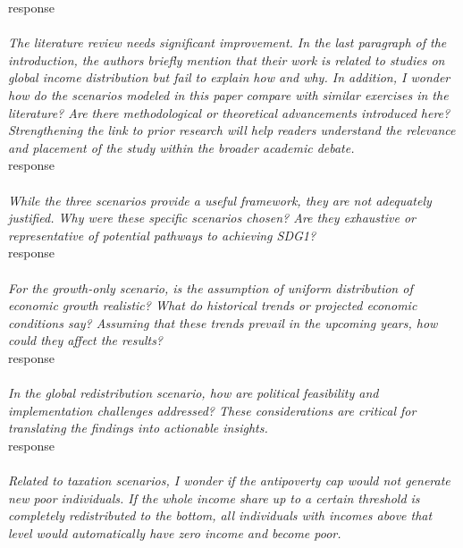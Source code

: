 \documentclass[12pt,english]{article}
\begin{document}
response
~\\ ~\\

\textit{The literature review needs significant improvement. In the last paragraph of the introduction, the authors briefly mention that their work is related to studies on global income distribution but fail to explain how and why. In addition, I wonder how do the scenarios modeled in this paper compare with similar exercises in the literature? Are there methodological or theoretical advancements introduced here? Strengthening the link to prior research will help readers understand the relevance and placement of the study within the broader academic debate. }~\\

response
~\\ ~\\

\textit{While the three scenarios provide a useful framework, they are not adequately justified. Why were these specific scenarios chosen? Are they exhaustive or representative of potential pathways to achieving SDG1? }~\\

response
~\\ ~\\

\textit{For the growth-only scenario, is the assumption of uniform distribution of economic growth realistic? What do historical trends or projected economic conditions say? Assuming that these trends prevail in the upcoming years, how could they affect the results? }~\\

response
~\\ ~\\

\textit{In the global redistribution scenario, how are political feasibility and implementation challenges addressed? These considerations are critical for translating the findings into actionable insights. }~\\

response
~\\ ~\\

\textit{Related to taxation scenarios, I wonder if the antipoverty cap would not generate new poor individuals. If the whole income share up to a certain threshold is completely redistributed to the bottom, all individuals with incomes above that level would automatically have zero income and become poor. }~\\
\end{document}
